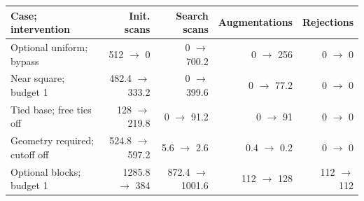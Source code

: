 \begin{tabular}{lrrrr}
\toprule
Case; intervention & Init. scans & Search scans & Augmentations & Rejections \\
\midrule
Optional uniform; bypass & 512 $\to$ 0 & 0 $\to$ 700.2 & 0 $\to$ 256 & 0 $\to$ 0 \\
Near square; budget 1 & 482.4 $\to$ 333.2 & 0 $\to$ 399.6 & 0 $\to$ 77.2 & 0 $\to$ 0 \\
Tied base; free ties off & 128 $\to$ 219.8 & 0 $\to$ 91.2 & 0 $\to$ 91 & 0 $\to$ 0 \\
Geometry required; cutoff off & 524.8 $\to$ 597.2 & 5.6 $\to$ 2.6 & 0.4 $\to$ 0.2 & 0 $\to$ 0 \\
Optional blocks; budget 1 & 1285.8 $\to$ 384 & 872.4 $\to$ 1001.6 & 112 $\to$ 128 & 112 $\to$ 112 \\
\bottomrule
\end{tabular}
